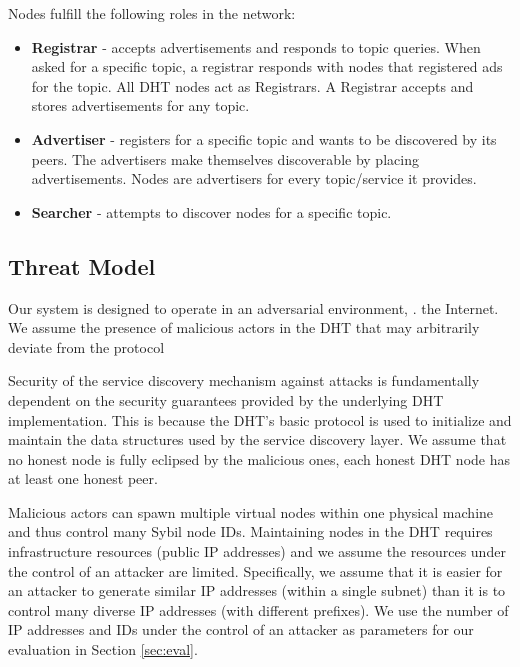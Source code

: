 Nodes fulfill the following roles in the network:

\begin{itemize}
    \item \textbf{Registrar} - accepts advertisements and responds to topic queries. When asked for a specific topic, a registrar responds with nodes that registered ads for the topic.  All DHT nodes act as Registrars. A Registrar accepts and stores advertisements for any topic.
    \item \textbf{Advertiser} - registers for a specific topic and wants to be discovered by its peers. The advertisers make themselves discoverable by placing advertisements. Nodes are advertisers for every topic/service it provides.
    \item \textbf{Searcher} - attempts to discover nodes for a specific topic.
\end{itemize}

\subsection{Threat Model}
Our system is designed to operate in an adversarial environment, \ie. the Internet. We assume the presence of malicious actors in the DHT that may arbitrarily deviate from the protocol%

Security of the service discovery mechanism against attacks is fundamentally dependent on the security guarantees provided by the underlying DHT implementation. This is because the DHT's basic protocol is used to initialize and maintain the data structures used by the service discovery layer. We assume that no honest node is fully eclipsed by the malicious ones, \ie each honest DHT node has at least one honest peer. 

Malicious actors can spawn multiple virtual nodes within one physical machine and thus control many Sybil node IDs. Maintaining nodes in the DHT requires infrastructure resources (public IP addresses) and we assume the resources under the control of an attacker are limited. Specifically, we assume that it is easier for an attacker to generate similar IP addresses (\ie within a single subnet) than it is to control many diverse IP addresses (with different prefixes). We use the number of IP addresses and IDs under the control of an attacker as parameters for our evaluation in Section \ref{sec:eval}.

